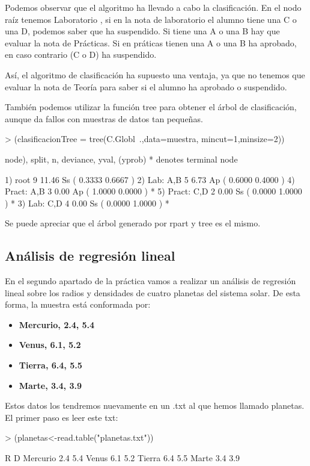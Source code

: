 \documentclass[a4paper]{article}
\begin{document}
Podemos observar que el algoritmo ha llevado a cabo la clasificación. En el nodo raíz tenemos Laboratorio , si en la nota de laboratorio el alumno tiene una C o una D, podemos saber que ha suspendido. Si tiene una A o una B hay que evaluar la nota de Prácticas. Si en práticas tienen una A o una B ha aprobado, en caso contrario (C o D) ha suspendido.

Así, el algoritmo de clasificación ha supuesto una ventaja, ya que no tenemos que evaluar la nota de Teoría para saber si el alumno ha aprobado o suspendido.

También podemos utilizar la función tree para obtener el árbol de clasificación, aunque da fallos con muestras de datos tan pequeñas.
\begin{Schunk}
\begin{Sinput}
> (clasificacionTree = tree(C.Globl~.,data=muestra, mincut=1,minsize=2))
\end{Sinput}
\begin{Soutput}
node), split, n, deviance, yval, (yprob)
      * denotes terminal node

1) root 9 11.46 Ss ( 0.3333 0.6667 )  
  2) Lab: A,B 5  6.73 Ap ( 0.6000 0.4000 )  
    4) Pract: A,B 3  0.00 Ap ( 1.0000 0.0000 ) *
    5) Pract: C,D 2  0.00 Ss ( 0.0000 1.0000 ) *
  3) Lab: C,D 4  0.00 Ss ( 0.0000 1.0000 ) *
\end{Soutput}
\end{Schunk}

Se puede apreciar que el árbol generado por rpart y tree es el mismo.

\subsection{Análisis de regresión lineal}En el segundo apartado de la práctica vamos a realizar un análisis de regresión lineal sobre los radios y densidades de cuatro planetas del sistema solar. De esta forma, la muestra está conformada por:
\begin{itemize}
	\item \textbf{{Mercurio, 2.4, 5.4}}
	\item \textbf{{Venus, 6.1, 5.2}}
	\item \textbf{{Tierra, 6.4, 5.5}}
        \item \textbf{{Marte, 3.4, 3.9}}
\end{itemize}

Estos datos los tendremos nuevamente en un .txt al que hemos llamado planetas. El primer paso es leer este txt:
\begin{Schunk}
\begin{Sinput}
> (planetas<-read.table("planetas.txt"))
\end{Sinput}
\begin{Soutput}
           R   D
Mercurio 2.4 5.4
Venus    6.1 5.2
Tierra   6.4 5.5
Marte    3.4 3.9
\end{Soutput}
\end{Schunk}
\end{document}
